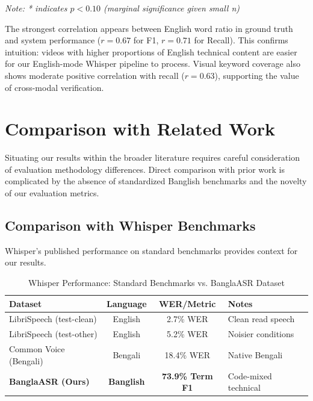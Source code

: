 \textit{Note: * indicates $p < 0.10$ (marginal significance given small n)}

The strongest correlation appears between English word ratio in ground truth and system performance ($r = 0.67$ for F1, $r = 0.71$ for Recall). This confirms intuition: videos with higher proportions of English technical content are easier for our English-mode Whisper pipeline to process. Visual keyword coverage also shows moderate positive correlation with recall ($r = 0.63$), supporting the value of cross-modal verification.

\section{Comparison with Related Work}

Situating our results within the broader literature requires careful consideration of evaluation methodology differences. Direct comparison with prior work is complicated by the absence of standardized Banglish benchmarks and the novelty of our evaluation metrics.

\subsection{Comparison with Whisper Benchmarks}

Whisper's published performance on standard benchmarks \cite{Radford2023} provides context for our results.

\begin{table}[h]
\centering
\caption{Whisper Performance: Standard Benchmarks vs. BanglaASR Dataset}
\label{tab:whisper_comparison}
\begin{tabular}{|l|c|c|l|}
\hline
\textbf{Dataset} & \textbf{Language} & \textbf{WER/Metric} & \textbf{Notes} \\
\hline
LibriSpeech (test-clean) & English & 2.7\% WER & Clean read speech \\
\hline
LibriSpeech (test-other) & English & 5.2\% WER & Noisier conditions \\
\hline
Common Voice (Bengali) & Bengali & 18.4\% WER & Native Bengali \\
\hline
\textbf{BanglaASR (Ours)} & \textbf{Banglish} & \textbf{73.9\% Term F1} & Code-mixed technical \\
\hline
\end{tabular}
\end{table}

